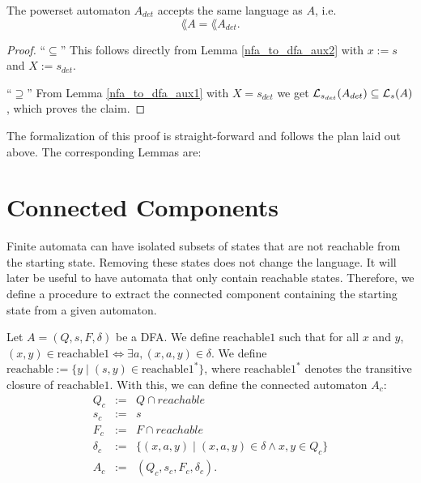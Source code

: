 \begin{theorem}
    \label{nfa_to_dfa}
    The powerset automaton $A_{det}$ accepts the same language as $A$, i.e.
    \begin{equation*}        
        \lang{A} = \lang{A_{det}}.        
    \end{equation*}
\end{theorem}
\begin{proof}
    ``$\subseteq$'' 
    This follows directly from Lemma \ref{nfa_to_dfa_aux2} with $x := s$ and $X := {s}_{det}$.

    ``$\supseteq$''
    From Lemma \ref{nfa_to_dfa_aux1} with $X = {s}_{det}$ we get 
    $\mathcal{L}_{s_{det}}(A_{det}) \subseteq \mathcal{L}_{s}(A)$, which proves the claim.
\end{proof}


The formalization of this proof is straight-forward and follows the plan laid out above. 
The corresponding Lemmas are:


\section{Connected Components}
 
Finite automata can have isolated subsets of states that are not reachable from the starting state. 
Removing these states does not change the language.
It will later be useful to have automata that only contain reachable states. 
Therefore, we define a procedure to extract the connected component containing the starting state from a given automaton.

\begin{definition}
    \label{A_c}
    Let $A = (Q, s, F, \delta)$ be a DFA.
    We define $\mathrm{reachable1}$ such that for all $x$ and $y$, 
    $(x,y) \in \mathrm{reachable1} \iff \exists a, (x,a,y) \in \delta$.
    We define $\mathrm{reachable} := \{y \; | \; (s,y) \in \mathrm{reachable1}^*\}$, 
    where $\mathrm{reachable1}^*$ denotes the transitive closure of $\mathrm{reachable1}$.
    With this, we can define the connected automaton $A_c$:
    \begin{eqnarray*}
        Q_c & := & Q \cap reachable \\
        s_c & := & s \\
        F_c & := & F \cap reachable \\
        \delta_c & := & \{(x, a, y) \; | \; (x, a, y) \in \delta \wedge x,y \in Q_c \} \\
        A_c &:=& (Q_c, s_c, F_c, \delta_c).
    \end{eqnarray*}
\end{definition}


